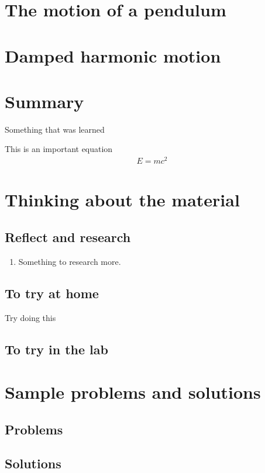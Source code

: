 \section{The motion of a pendulum}

\section{Damped harmonic motion}



\newpage
\section{Summary}

\begin{chapterSummary}{
\item Something that was learned
}
\end{chapterSummary}

\newpage
\begin{importantEquations}
This is an important equation
\begin{align*}
E = mc^2
\end{align*}

\end{importantEquations}


\newpage
\section{Thinking about the material}
\subsection{Reflect and research}

\begin{enumerate}
\item Something to research more.
\end{enumerate}
\subsection{To try at home}

\begin{tQuestion}Try doing this \end{tQuestion}

\subsection{To try in the lab}

\newpage
\section{Sample problems and solutions}
\subsection{Problems}


\newpage
\subsection{Solutions}


